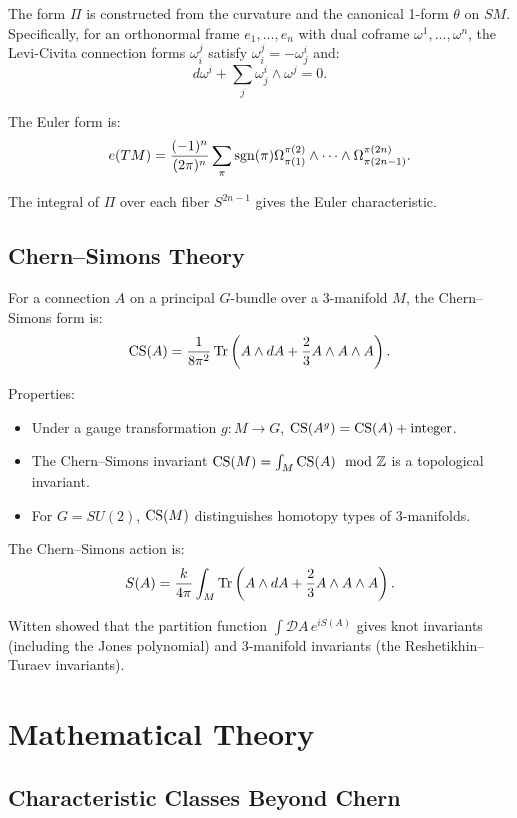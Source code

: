 The form $\Pi$ is constructed from the curvature and the canonical 1-form $\theta$ on $SM$. Specifically, for an orthonormal frame $e_1, \ldots, e_n$ with dual coframe $\omega^1, \ldots, \omega^n$, the Levi-Civita connection forms $\omega_i^j$ satisfy $\omega_i^j = -\omega_j^i$ and:
\[
d\omega^i + \sum_j \omega_j^i \wedge \omega^j = 0.
\]

The Euler form is:
\[
e(TM) = \frac{(-1)^{n}}{(2\pi)^n} \sum_{\pi} \operatorname{sgn}(\pi) \Omega_{\pi(1)}^{\pi(2)} \wedge \cdots \wedge \Omega_{\pi(2n-1)}^{\pi(2n)}.
\]

The integral of $\Pi$ over each fiber $S^{2n-1}$ gives the Euler characteristic.

\subsection{Chern--Simons Theory}

For a connection $A$ on a principal $G$-bundle over a 3-manifold $M$, the Chern--Simons form is:
\[
\operatorname{CS}(A) = \frac{1}{8\pi^2} \Tr\left(A \wedge dA + \frac{2}{3} A \wedge A \wedge A\right).
\]

Properties:
\begin{itemize}
    \item Under a gauge transformation $g: M \to G$, $\operatorname{CS}(A^g) = \operatorname{CS}(A) + \text{integer}$.
    \item The Chern--Simons invariant $\operatorname{CS}(M) = \int_M \operatorname{CS}(A) \mod \mathbb{Z}$ is a topological invariant.
    \item For $G = SU(2)$, $\operatorname{CS}(M)$ distinguishes homotopy types of 3-manifolds.
\end{itemize}

The Chern--Simons action is:
\[
S(A) = \frac{k}{4\pi} \int_M \Tr\left(A \wedge dA + \frac{2}{3} A \wedge A \wedge A\right).
\]

Witten showed that the partition function $\int \mathcal{D}A \, e^{iS(A)}$ gives knot invariants (including the Jones polynomial) and 3-manifold invariants (the Reshetikhin--Turaev invariants).

\section{Mathematical Theory}

\subsection{Characteristic Classes Beyond Chern}

